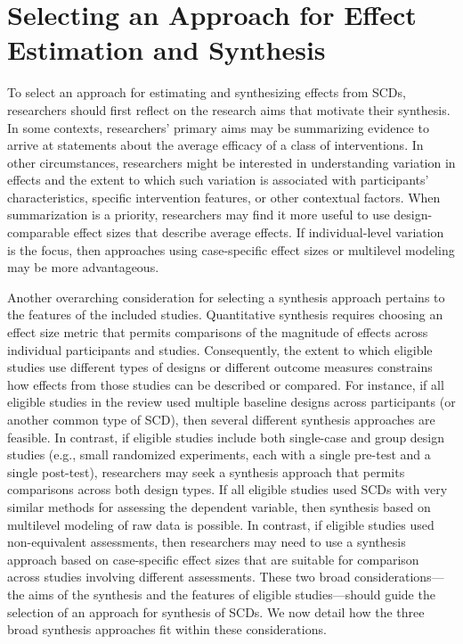 \documentclass[
]{book}
\begin{document}
\hypertarget{selecting-an-approach-for-effect-estimation-and-synthesis}{%
\section{Selecting an Approach for Effect Estimation and Synthesis}\label{selecting-an-approach-for-effect-estimation-and-synthesis}}

To select an approach for estimating and synthesizing effects from SCDs, researchers should first reflect on the research aims that motivate their synthesis.
In some contexts, researchers' primary aims may be summarizing evidence to arrive at statements about the average efficacy of a class of interventions.
In other circumstances, researchers might be interested in understanding variation in effects and the extent to which such variation is associated with participants' characteristics, specific intervention features, or other contextual factors.
When summarization is a priority, researchers may find it more useful to use design-comparable effect sizes that describe average effects.
If individual-level variation is the focus, then approaches using case-specific effect sizes or multilevel modeling may be more advantageous.

Another overarching consideration for selecting a synthesis approach pertains to the features of the included studies.
Quantitative synthesis requires choosing an effect size metric that permits comparisons of the magnitude of effects across individual participants and studies.
Consequently, the extent to which eligible studies use different types of designs or different outcome measures constrains how effects from those studies can be described or compared.
For instance, if all eligible studies in the review used multiple baseline designs across participants (or another common type of SCD), then several different synthesis approaches are feasible.
In contrast, if eligible studies include both single-case and group design studies (e.g., small randomized experiments, each with a single pre-test and a single post-test), researchers may seek a synthesis approach that permits comparisons across both design types.
If all eligible studies used SCDs with very similar methods for assessing the dependent variable, then synthesis based on multilevel modeling of raw data is possible.
In contrast, if eligible studies used non-equivalent assessments, then researchers may need to use a synthesis approach based on case-specific effect sizes that are suitable for comparison across studies involving different assessments.
These two broad considerations---the aims of the synthesis and the features of eligible studies---should guide the selection of an approach for synthesis of SCDs.
We now detail how the three broad synthesis approaches fit within these considerations.
\end{document}
